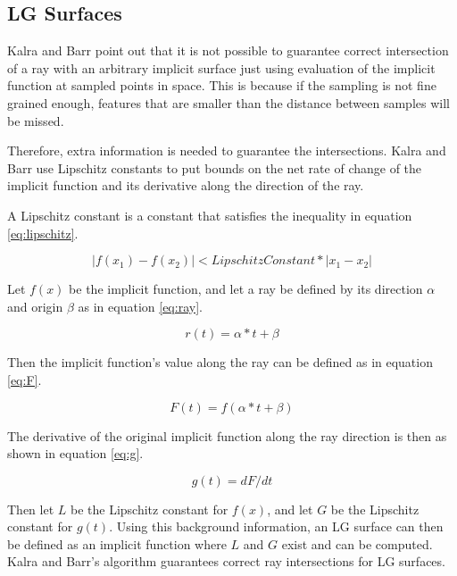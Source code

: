 \documentclass[conference]{acmsiggraph}
\begin{document}
\subsection{LG Surfaces}
\label{sec:LGSurfaces}

Kalra and Barr \cite{KalraBarr1989} point out that it is not possible to
guarantee correct intersection of a ray with an arbitrary implicit surface
just using evaluation of the implicit function at sampled points in space.
This is because if the sampling is not fine grained enough, features that
are smaller than the distance between samples will be missed.

Therefore, extra information is needed to guarantee the intersections.
Kalra and Barr use Lipschitz constants to put bounds
on the net rate of change of the implicit function and its derivative along
the direction of the ray.

A Lipschitz constant is a constant that satisfies the inequality in 
equation \ref{eq:lipschitz}.

\begin{equation}
\label{eq:lipschitz}
|f(x_1) - f(x_2)| < LipschitzConstant * |x_1 - x_2|
\end{equation}

Let $f(x)$ be the implicit function, and let a ray be defined by its 
direction $\alpha$ and origin $\beta$ as in equation \ref{eq:ray}.

\begin{equation}
\label{eq:ray}
r(t) = \alpha * t + \beta
\end{equation}

Then the implicit function's value along the ray can be defined as in
equation \ref{eq:F}.

\begin{equation}
\label{eq:F}
F(t) = f(\alpha * t + \beta)
\end{equation}

The derivative of the original implicit function along the ray direction is 
then as shown in equation \ref{eq:g}.

\begin{equation}
\label{eq:g}
g(t) = dF/dt
\end{equation}

Then let $L$ be the Lipschitz constant for $f(x)$, and let $G$ be the Lipschitz
constant for $g(t)$.  Using this background information, an LG surface can
then be defined as an implicit function where $L$ and $G$ exist and can be
computed.  Kalra and Barr's algorithm guarantees correct ray intersections
for LG surfaces.
\end{document}
